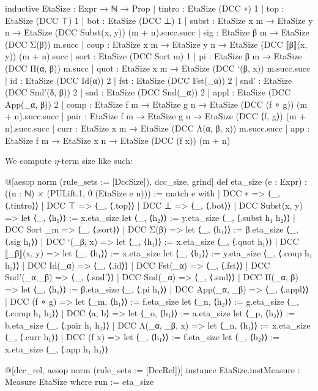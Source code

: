 \documentclass{article}
\begin{document}
\begin{leancode}
inductive EtaSize : Expr → ℕ → Prop
  | tintro : EtaSize (DCC ∗) 1
  | top    : EtaSize (DCC ⊤) 1
  | bot    : EtaSize (DCC ⊥) 1
  | subst  : EtaSize x m → EtaSize y n → EtaSize (DCC Subst(x, y)) (m + n).succ.succ
  | sig    : EtaSize β m → EtaSize (DCC Σ(β)) m.succ
  | coup   : EtaSize x m → EtaSize y n → EtaSize (DCC ⟦β⟧(x, y)) (m + n).succ
  | sort   : EtaSize (DCC Sort m) 1
  | pi     : EtaSize β m → EtaSize (DCC Π(α, β)) m.succ
  | quot   : EtaSize x m → EtaSize (DCC `(β, x)) m.succ.succ
  | id     : EtaSize (DCC Id(α)) 2
  | fst    : EtaSize (DCC Fst(_α)) 2
  | snd'   : EtaSize (DCC Snd'(δ, β)) 2
  | snd    : EtaSize (DCC Snd(_α)) 2
  | appl   : EtaSize (DCC App(_α, β)) 2
  | comp   : EtaSize f m → EtaSize g n → EtaSize (DCC (f ∘ g)) (m + n).succ.succ
  | pair   : EtaSize f m → EtaSize g n → EtaSize (DCC ⟨f, g⟩) (m + n).succ.succ
  | curr   : EtaSize x m → EtaSize (DCC Λ(α, β, x)) m.succ.succ
  | app    : EtaSize f m → EtaSize x n → EtaSize (DCC (f x)) (m + n)
\end{leancode}

We compute \(\eta\)-term size like such:

\begin{leancode}
@[aesop norm (rule_sets := [DccSize]), dcc_size, grind]
def eta_size (e : Expr) : ((n : ℕ) × (PULift.{1, 0} (EtaSize e n))) :=
  match e with
  | DCC ∗ => ⟨_, ⟨.tintro⟩⟩
  | DCC ⊤ => ⟨_, ⟨.top⟩⟩
  | DCC ⊥ => ⟨_, ⟨.bot⟩⟩
  | DCC Subst(x, y) =>
    let ⟨_, ⟨h₁⟩⟩ := x.eta_size
    let ⟨_, ⟨h₂⟩⟩ := y.eta_size
    ⟨_, ⟨.subst h₁ h₂⟩⟩
  | DCC Sort _m => ⟨_, ⟨.sort⟩⟩
  | DCC Σ(β) =>
    let ⟨_, ⟨h₁⟩⟩ := β.eta_size
    ⟨_, ⟨.sig h₁⟩⟩
  | DCC `(_β, x) =>
    let ⟨_, ⟨h₁⟩⟩ := x.eta_size
    ⟨_, ⟨.quot h₁⟩⟩
  | DCC ⟦_β⟧(x, y) =>
    let ⟨_, ⟨h₁⟩⟩ := x.eta_size
    let ⟨_, ⟨h₂⟩⟩ := y.eta_size
    ⟨_, ⟨.coup h₁ h₂⟩⟩
  | DCC Id(_α)      => ⟨_, ⟨.id⟩⟩
  | DCC Fst(_α) => ⟨_, ⟨.fst⟩⟩
  | DCC Snd'(_α,_β) => ⟨_, ⟨.snd'⟩⟩
  | DCC Snd(_α) => ⟨_, ⟨.snd⟩⟩
  | DCC Π(_α, β) =>
    let ⟨_, ⟨h₁⟩⟩ := β.eta_size
    ⟨_, ⟨.pi h₁⟩⟩
  | DCC App(_α, _β)  => ⟨_, ⟨.appl⟩⟩
  | DCC (f ∘ g) =>
    let ⟨_m, ⟨h₁⟩⟩ := f.eta_size
    let ⟨_n, ⟨h₂⟩⟩ := g.eta_size
    ⟨_, ⟨.comp h₁ h₂⟩⟩
  | DCC ⟨a, b⟩ =>
    let ⟨_o, ⟨h₁⟩⟩ := a.eta_size
    let ⟨_p, ⟨h₂⟩⟩ := b.eta_size
    ⟨_, ⟨.pair h₁ h₂⟩⟩
  | DCC Λ(_α, _β, x) =>
    let ⟨_n, ⟨h₁⟩⟩ := x.eta_size
    ⟨_, ⟨.curr h₁⟩⟩
  | DCC (f x) =>
    let ⟨_, ⟨h₁⟩⟩ := f.eta_size
    let ⟨_, ⟨h₂⟩⟩ := x.eta_size
    ⟨_, ⟨.app h₁ h₂⟩⟩

@[dcc_rel, aesop norm (rule_sets := [DccRel])]
instance EtaSize.instMeasure : Measure EtaSize where
  run := eta_size
\end{leancode}
\end{document}
